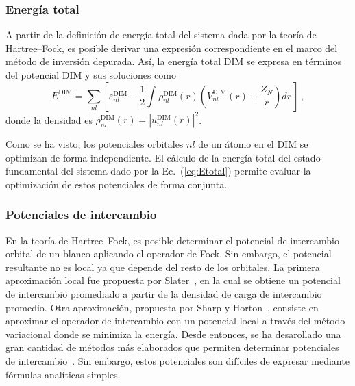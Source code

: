\subsubsection*{Energía total}

A partir de la definición de energía total del sistema dada por la 
teoría de Hartree--Fock, es posible derivar una expresión 
correspondiente en el marco del método de inversión depurada. Así, la 
energía total DIM se expresa en términos del potencial DIM y sus 
soluciones como
\begin{equation}
E^{\mathrm{DIM}} = \sum\limits_{nl} 
\left[ 
\varepsilon_{nl}^{\mathrm{DIM}} - 
\frac{1}{2}\int  \rho_{nl}^{\mathrm{DIM}}(r)
\left( V_{nl}^{\mathrm{DIM}}(r) + \frac{Z_{N}}{r}\right) dr \,
\right] \, ,
\label{eq:Etotal}
\end{equation}
donde la densidad es 
$\rho_{nl}^{\mathrm{DIM}}(r)=|u_{nl}^{\mathrm{DIM}}(r)|^2$. 

Como se ha visto, los potenciales orbitales $nl$ de un átomo en el DIM 
se optimizan de forma independiente. El cálculo de la energía total del 
estado fundamental del sistema dado por la Ec.~(\ref{eq:Etotal}) permite 
evaluar la optimización de estos potenciales de forma conjunta.

\subsubsection*{Potenciales de intercambio}

En la teoría de Hartree--Fock, es posible determinar el potencial de 
intercambio orbital de un blanco aplicando el operador de Fock. Sin 
embargo, el potencial resultante no es local ya que depende del resto de 
los orbitales. La primera aproximación local fue propuesta por 
Slater~\cite{Slater:51}, en la cual se obtiene un potencial de 
intercambio promediado a partir de la densidad de carga de intercambio 
promedio. Otra aproximación, propuesta por Sharp y 
Horton~\cite{Sharp:53}, consiste en aproximar el operador de intercambio 
con un potencial local a través del método variacional donde se minimiza 
la energía. Desde entonces, se ha desarollado una gran cantidad de 
métodos más elaborados que permiten determinar potenciales de 
intercambio~\cite{Krieger:92,Gorling:92,Yang:02,Staroverov:06,
Ryabinkin:13}. Sin embargo, estos potenciales son difíciles de expresar 
mediante fórmulas analíticas simples.

